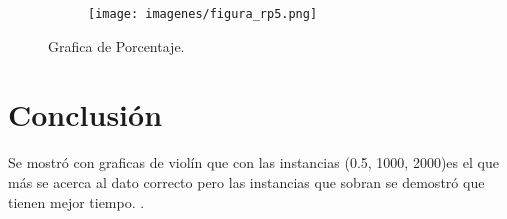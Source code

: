 \documentclass{article}
\begin{document}
\begin{figure}[H]
\centering
\begin{subfigure}[b]{1.0\linewidth}
\texttt{[image: imagenes/figura\_rp5.png]}
\end{subfigure}
\caption{Grafica de Porcentaje.}
\label{fig:westminster}
\end{figure}




 \section{Conclusión}
Se mostró con graficas de violín que con las instancias (0.5, 1000, 2000)es el que más se acerca al dato correcto pero las instancias que sobran se demostró que tienen mejor tiempo. 
.

 
 

 
\end{document}
